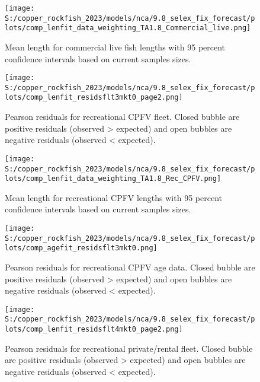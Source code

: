 \documentclass[
  letterpaper,
]{article}
\begin{document}
\begin{figure}
\centering
\texttt{[image: S:/copper\_rockfish\_2023/models/nca/9.8\_selex\_fix\_forecast/plots/comp\_lenfit\_data\_weighting\_TA1.8\_Commercial\_live.png]}
\caption{Mean length for commercial live fish lengths with 95 percent confidence intervals based on current samples sizes.\label{fig:com-live-mean-len-fit}}
\end{figure}

\pagebreak

\begin{figure}
\centering
\texttt{[image: S:/copper\_rockfish\_2023/models/nca/9.8\_selex\_fix\_forecast/plots/comp\_lenfit\_residsflt3mkt0\_page2.png]}
\caption{Pearson residuals for recreational CPFV fleet. Closed bubble are positive residuals (observed \textgreater{} expected) and open bubbles are negative residuals (observed \textless{} expected).\label{fig:rec-cpfv-pearson}}
\end{figure}

\pagebreak

\begin{figure}
\centering
\texttt{[image: S:/copper\_rockfish\_2023/models/nca/9.8\_selex\_fix\_forecast/plots/comp\_lenfit\_data\_weighting\_TA1.8\_Rec\_CPFV.png]}
\caption{Mean length for recreational CPFV lengths with 95 percent confidence intervals based on current samples sizes.\label{fig:rec-cpfv-mean-len-fit}}
\end{figure}

\pagebreak

\begin{figure}
\centering
\texttt{[image: S:/copper\_rockfish\_2023/models/nca/9.8\_selex\_fix\_forecast/plots/comp\_agefit\_residsflt3mkt0.png]}
\caption{Pearson residuals for recreational CPFV age data. Closed bubble are positive residuals (observed \textgreater{} expected) and open bubbles are negative residuals (observed \textless{} expected).\label{fig:rec-cpfv-age-pearson}}
\end{figure}

\pagebreak

\begin{figure}
\centering
\texttt{[image: S:/copper\_rockfish\_2023/models/nca/9.8\_selex\_fix\_forecast/plots/comp\_lenfit\_residsflt4mkt0\_page2.png]}
\caption{Pearson residuals for recreational private/rental fleet. Closed bubble are positive residuals (observed \textgreater{} expected) and open bubbles are negative residuals (observed \textless{} expected).\label{fig:rec-pr-pearson}}
\end{figure}
\end{document}

